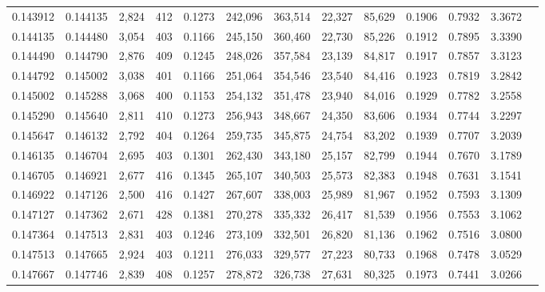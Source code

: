 \begin{tabular}{rrrrrrrrrrrrr}
0.143912 & 0.144135 & 2,824 & 412 &                                     0.1273 & 242,096 & 363,514 &  22,327 &  85,629 & 0.1906 & 0.7932 & 3.3672 \\
0.144135 & 0.144480 & 3,054 & 403 &                                     0.1166 & 245,150 & 360,460 &  22,730 &  85,226 & 0.1912 & 0.7895 & 3.3390 \\
0.144490 & 0.144790 & 2,876 & 409 &                                     0.1245 & 248,026 & 357,584 &  23,139 &  84,817 & 0.1917 & 0.7857 & 3.3123 \\
0.144792 & 0.145002 & 3,038 & 401 &                                     0.1166 & 251,064 & 354,546 &  23,540 &  84,416 & 0.1923 & 0.7819 & 3.2842 \\
0.145002 & 0.145288 & 3,068 & 400 &                                     0.1153 & 254,132 & 351,478 &  23,940 &  84,016 & 0.1929 & 0.7782 & 3.2558 \\
0.145290 & 0.145640 & 2,811 & 410 &                                     0.1273 & 256,943 & 348,667 &  24,350 &  83,606 & 0.1934 & 0.7744 & 3.2297 \\
0.145647 & 0.146132 & 2,792 & 404 &                                     0.1264 & 259,735 & 345,875 &  24,754 &  83,202 & 0.1939 & 0.7707 & 3.2039 \\
0.146135 & 0.146704 & 2,695 & 403 &                                     0.1301 & 262,430 & 343,180 &  25,157 &  82,799 & 0.1944 & 0.7670 & 3.1789 \\
0.146705 & 0.146921 & 2,677 & 416 &                                     0.1345 & 265,107 & 340,503 &  25,573 &  82,383 & 0.1948 & 0.7631 & 3.1541 \\
0.146922 & 0.147126 & 2,500 & 416 &                                     0.1427 & 267,607 & 338,003 &  25,989 &  81,967 & 0.1952 & 0.7593 & 3.1309 \\
0.147127 & 0.147362 & 2,671 & 428 &                                     0.1381 & 270,278 & 335,332 &  26,417 &  81,539 & 0.1956 & 0.7553 & 3.1062 \\
0.147364 & 0.147513 & 2,831 & 403 &                                     0.1246 & 273,109 & 332,501 &  26,820 &  81,136 & 0.1962 & 0.7516 & 3.0800 \\
0.147513 & 0.147665 & 2,924 & 403 &                                     0.1211 & 276,033 & 329,577 &  27,223 &  80,733 & 0.1968 & 0.7478 & 3.0529 \\
0.147667 & 0.147746 & 2,839 & 408 &                                     0.1257 & 278,872 & 326,738 &  27,631 &  80,325 & 0.1973 & 0.7441 & 3.0266 \\

\end{tabular}
